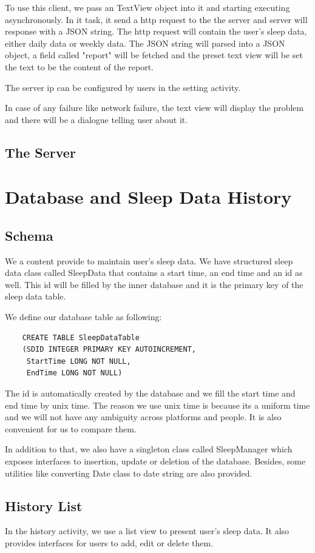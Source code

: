 \documentclass[14pt]{extreport}
\begin{document}
To use this client, we pass an TextView object into it and starting executing asynchronously. In it task, it send a http request to the the server and server will response with a JSON string.  The http request will contain the user's sleep data, either daily data or weekly data. The JSON string will parsed into a JSON object, a field called "report" will be fetched and the preset text view will be set the text to be the content of the report.

The server ip can be configured by users in the setting activity.

In case of any failure like network failure, the text view will display the problem and there will be a dialogue telling user about it.

\section{The Server}

\chapter{Database and Sleep Data History}

\section{Schema}
We a content provide to maintain user's sleep data. We have structured sleep data class called SleepData that contains a start time, an end time and an id as well. This id will be filled by the inner database and it is the primary key of the sleep data table.

We define our database table as following:
\begin{verbatim}
    CREATE TABLE SleepDataTable
    (SDID INTEGER PRIMARY KEY AUTOINCREMENT, 
     StartTime LONG NOT NULL,
     EndTime LONG NOT NULL)
\end{verbatim}
The id is automatically created by the database and we fill the start time and end time by unix time. The reason we use unix time is because its a uniform time and we will not have any ambiguity across platforms and people. It is also convenient for us to compare them.

In addition to that, we also have a singleton class called SleepManager which exposes interfaces to insertion, update or deletion of the database. Besides, some utilities like converting Date class to date string are also provided.

\section{History List}
In the history activity, we use a list view to present user's sleep data. It also provides interfaces for users to add, edit or delete them.
\end{document}
